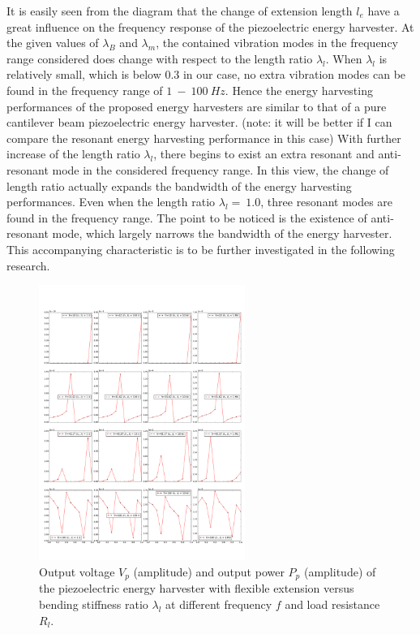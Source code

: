 \documentclass{elsarticle}
\begin{document}
It is easily seen from the diagram that the change of extension length $l_e$ have a great influence on the frequency response of the piezoelectric energy harvester. At the given values of $\lambda_B$ and $\lambda_m$, the contained vibration modes in the frequency range considered does change with respect to
the length ratio $\lambda_l$. When $\lambda_l$ is relatively small, which is below $0.3$ in our case, no extra vibration modes can be found in the frequency range of $1\ - \ 100\ Hz$. Hence the energy harvesting performances of the proposed energy harvesters are similar to that of a pure cantilever beam piezoelectric energy harvester. (note: it will be better if I can compare the resonant energy harvesting performance in this case) With further increase of the length ratio $\lambda_l$, there begins to exist an extra resonant and anti-resonant mode in the considered frequency range. In this view, the change of length ratio actually expands the bandwidth of the energy harvesting performances. Even when the length ratio $\lambda_l =\ 1.0$, three resonant modes are found in the frequency range. The point to be noticed is the existence of anti-resonant mode, which largely narrows the bandwidth of the energy harvester. This accompanying characteristic is to be further investigated in the following research. 

\begin{figure}[!htbp]
    \centering
    \includegraphics[width=0.6\textwidth]{./fig_pow_fr_sl_Rl_sl_vs_laml}
    \caption{Output voltage $V_p$ (amplitude) and output power $P_p$ (amplitude) of the piezoelectric energy harvester with flexible extension versus bending stiffness ratio $\lambda_l$ at different frequency $f$ and load resistance $R_l$. }
    \label{fig:fig_pow_fr_sl_Rl_sl_vs_laml}
\end{figure}
\end{document}
